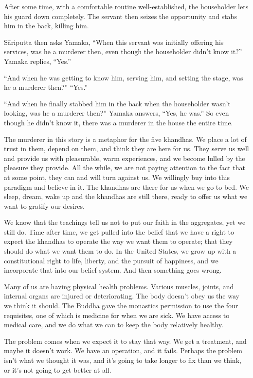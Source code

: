 After some time, with a comfortable routine well-established, the householder lets his guard down completely. The servant then seizes the opportunity and stabs him in the back, killing him.

Sāriputta then asks Yamaka, ``When this servant was initially offering his services, was he a murderer then, even though the householder didn't know it?'' Yamaka replies, ``Yes.''

``And when he was getting to know him, serving him, and setting the stage, was he a murderer then?'' ``Yes.''

``And when he finally stabbed him in the back when the householder wasn't looking, was he a murderer then?'' Yamaka answers, ``Yes, he was.'' So even though he didn't know it, there was a murderer in the house the entire time.

The murderer in this story is a metaphor for the five khandhas. We place a lot of trust in them, depend on them, and think they are here for us. They serve us well and provide us with pleasurable, warm experiences, and we become lulled by the pleasure they provide. All the while, we are not paying attention to the fact that at some point, they can and will turn against us. We willingly buy into this paradigm and believe in it. The khandhas are there for us when we go to bed. We sleep, dream, wake up and the khandhas are still there, ready to offer us what we want to gratify our desires.

We know that the teachings tell us not to put our faith in the aggregates, yet we still do. Time after time, we get pulled into the belief that we have a right to expect the khandhas to operate the way we want them to operate; that they should do what we want them to do. In the United States, we grow up with a constitutional right to life, liberty, and the pursuit of happiness, and we incorporate that into our belief system. And then something goes wrong.

Many of us are having physical health problems. Various muscles, joints, and internal organs are injured or deteriorating. The body doesn't obey us the way we think it should. The Buddha gave the monastics permission to use the four requisites, one of which is medicine for when we are sick. We have access to medical care, and we do what we can to keep the body relatively healthy.

The problem comes when we expect it to stay that way. We get a treatment, and maybe it doesn't work. We have an operation, and it fails. Perhaps the problem isn't what we thought it was, and it's going to take longer to fix than we think, or it's not going to get better at all.

